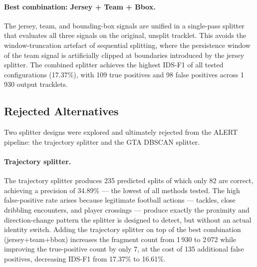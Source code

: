 \paragraph{Best combination: Jersey + Team + Bbox.}
The jersey, team, and bounding-box signals are unified in a single-pass
splitter that evaluates all three signals on the original, unsplit tracklet.
This avoids the window-truncation artefact of sequential splitting, where the
persistence window of the team signal is artificially clipped at boundaries
introduced by the jersey splitter. The combined splitter achieves the highest
IDS-F1 of all tested configurations (17.37\%), with 109 true positives and 98
false positives across 1\,930 output tracklets.

\subsection{Rejected Alternatives}\label{subsec:rejected_splitters}

Two splitter designs were explored and ultimately rejected from the ALERT
pipeline: the trajectory splitter and the GTA DBSCAN splitter.

\paragraph{Trajectory splitter.}
The trajectory splitter produces 235 predicted splits of which only 82 are
correct, achieving a precision of 34.89\% — the lowest of all methods tested.
The high false-positive rate arises because legitimate football actions —
tackles, close dribbling encounters, and player crossings — produce exactly the
proximity and direction-change pattern the splitter is designed to detect, but
without an actual identity switch. Adding the trajectory splitter on top of the
best combination (jersey+team+bbox) increases the fragment count from 1\,930
to 2\,072 while improving the true-positive count by only 7, at the cost of
135 additional false positives, decreasing IDS-F1 from 17.37\% to 16.61\%.


